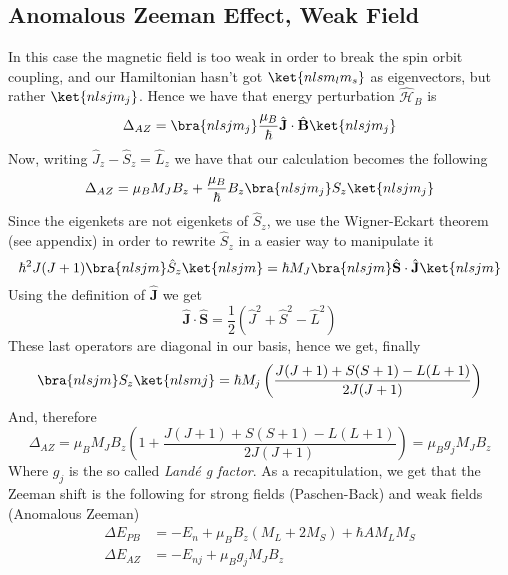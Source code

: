 \documentclass[a4paper, 11pt]{book}
\renewcommand{\vec}[1]{\mathbf{#1}}
\newcommand{\1}{\opr{\mathds{1}}}
\newcommand{\ham}{\mathcal{H}}
\newcommand{\opr}[1]{\hat{#1}}
\newcommand{\vecopr}[1]{\opr{\vec{#1}}}
\theoremstyle{plain}
\begin{document}
	\subsection{Anomalous Zeeman Effect, Weak Field}
	In this case the magnetic field is too weak in order to break the spin orbit coupling, and our Hamiltonian hasn't got $\ket{nlsm_lm_s}$ as eigenvectors, but rather $\ket{nlsjm_j}$. Hence we have that energy perturbation $\opr{\ham}_B$ is
	\begin{equation*}
		\Delta_{AZ}=\bra{nlsjm_j}\frac{\mu_B}{\hbar}\vecopr{J}\cdot\vecopr{B}\ket{nlsjm_j}
	\end{equation*}
	Now, writing $\opr{J}_z-\opr{S}_z=\opr{L}_z$ we have that our calculation becomes the following
	\begin{equation*}
		\Delta_{AZ}=\mu_BM_JB_z+\frac{\mu_B}{\hbar}B_z\bra{nlsjm_j}S_z\ket{nlsjm_j}
	\end{equation*}
	Since the eigenkets are not eigenkets of $\opr{S}_z$, we use the Wigner-Eckart theorem (see appendix) in order to rewrite $\opr{S}_z$ in a easier way to manipulate it
	\begin{equation}
		\hbar^2J(J+1)\bra{nlsjm}\opr{S}_z\ket{nlsjm}=\hbar M_J\bra{nlsjm}\vecopr{S}\cdot\vecopr{J}\ket{nlsjm}
		\label{eq:wignereckart}
	\end{equation}
	Using the definition of $\vecopr{J}$ we get
	\begin{equation*}
		\vecopr{J}\cdot\vecopr{S}=\frac{1}{2}\left( \opr{J}^2+\opr{S}^2-\opr{L}^2 \right)
	\end{equation*}
	These last operators are diagonal in our basis, hence we get, finally
	\begin{equation*}
		\bra{nlsjm}S_z\ket{nlsmj}=\hbar M_j\left( \frac{J(J+1)+S(S+1)-L(L+1)}{2J(J+1)} \right)
	\end{equation*}
	And, therefore
	\begin{equation}
		\Delta_{AZ}=\mu_BM_JB_z\left( 1+\frac{J(J+1)+S(S+1)-L(L+1)}{2J(J+1)} \right)=\mu_Bg_jM_JB_z
		\label{eq:anomalouszeemanshift1}
	\end{equation}
	Where $g_j$ is the so called \textit{Landé g factor}.
	As a recapitulation, we get that the Zeeman shift is the following for strong fields (Paschen-Back) and weak fields (Anomalous Zeeman)
	\begin{equation}
		\begin{aligned}
			\Delta E_{PB}&=-E_n+\mu_BB_z\left( M_L+2M_S \right)+\hbar AM_LM_S\\
			\Delta E_{AZ}&=-E_{nj}+\mu_Bg_jM_JB_z
		\end{aligned}
		\label{eq:zeemaneffecttot}
	\end{equation}
\end{document}
